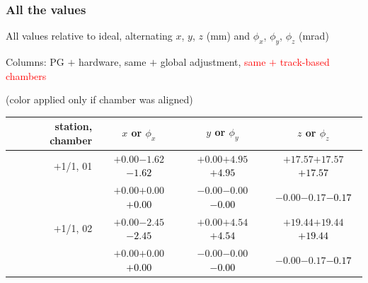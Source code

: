 \documentclass[compress]{beamer}
\begin{document}
\begin{frame}
\frametitle{All the values}
\tiny

All values relative to ideal, alternating $x$, $y$, $z$ (mm) and $\phi_x$, $\phi_y$, $\phi_z$ (mrad)

Columns: PG $+$ hardware, same $+$ global adjustment, \textcolor{red}{same $+$ track-based chambers}

\hfill (color applied only if chamber was aligned)

\vfill
\renewcommand{\arraystretch}{1.1}
\begin{tabular}{r | c | c | c}
station, chamber & $x$ or $\phi_x$ & $y$ or $\phi_y$ & $z$ or $\phi_z$ \\\hline
$+$1/1, 01 & $+0.00$\hspace{0.1 cm}$-1.62$\hspace{0.1 cm}\textcolor{black}{$-1.62$} & $+0.00$\hspace{0.1 cm}$+4.95$\hspace{0.1 cm}\textcolor{black}{$+4.95$} & $+17.57$\hspace{0.1 cm}$+17.57$\hspace{0.1 cm}\textcolor{black}{$+17.57$} \\
           & $+0.00$\hspace{0.1 cm}$+0.00$\hspace{0.1 cm}\textcolor{black}{$+0.00$} & $-0.00$\hspace{0.1 cm}$-0.00$\hspace{0.1 cm}\textcolor{black}{$-0.00$} & $-0.00$\hspace{0.1 cm}$-0.17$\hspace{0.1 cm}\textcolor{black}{$-0.17$} \\
$+$1/1, 02 & $+0.00$\hspace{0.1 cm}$-2.45$\hspace{0.1 cm}\textcolor{black}{$-2.45$} & $+0.00$\hspace{0.1 cm}$+4.54$\hspace{0.1 cm}\textcolor{black}{$+4.54$} & $+19.44$\hspace{0.1 cm}$+19.44$\hspace{0.1 cm}\textcolor{black}{$+19.44$} \\
           & $+0.00$\hspace{0.1 cm}$+0.00$\hspace{0.1 cm}\textcolor{black}{$+0.00$} & $-0.00$\hspace{0.1 cm}$-0.00$\hspace{0.1 cm}\textcolor{black}{$-0.00$} & $-0.00$\hspace{0.1 cm}$-0.17$\hspace{0.1 cm}\textcolor{black}{$-0.17$} \\

\end{tabular}
\end{frame}
\end{document}
